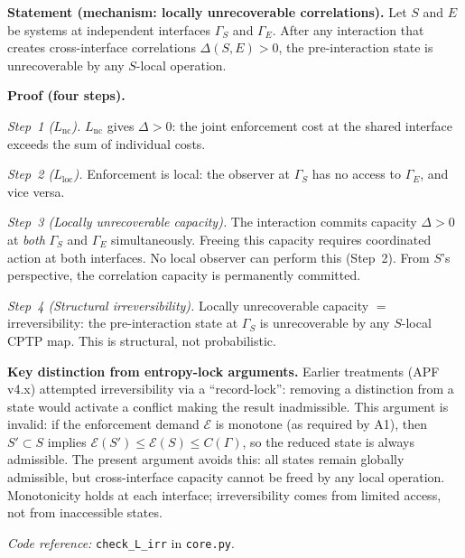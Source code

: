 \documentclass[11pt]{article}
\newcommand{\coderef}[2]{\smallskip\noindent\textit{Code reference:} \texttt{#1} in \texttt{#2}.}
\newcommand{\epitag}[1]{\textbf{[#1]}}
\begin{document}
\begin{tcolorbox}[apfbox, title={Lemma $L_{\mathrm{irr}}$ (Irreversibility from Admissibility Physics) \epitag{P}}]
\textbf{Statement (mechanism: locally unrecoverable correlations).}
Let $S$ and $E$ be systems at independent interfaces $\Gamma_S$ and
$\Gamma_E$.  After any interaction that creates cross-interface correlations
$\Delta(S,E) > 0$, the pre-interaction state is unrecoverable by any
$S$-local operation.

\textbf{Proof (four steps).}

\smallskip\noindent\emph{Step~1 ($L_{\mathrm{nc}}$).}  $L_{\mathrm{nc}}$
gives $\Delta > 0$: the joint enforcement cost at the shared interface exceeds
the sum of individual costs.

\smallskip\noindent\emph{Step~2 ($L_{\mathrm{loc}}$).}  Enforcement is local:
the observer at $\Gamma_S$ has no access to $\Gamma_E$, and vice versa.

\smallskip\noindent\emph{Step~3 (Locally unrecoverable capacity).}  The
interaction commits capacity $\Delta > 0$ at \emph{both} $\Gamma_S$ and
$\Gamma_E$ simultaneously.  Freeing this capacity requires coordinated action
at both interfaces.  No local observer can perform this (Step~2).  From $S$'s
perspective, the correlation capacity is permanently committed.

\smallskip\noindent\emph{Step~4 (Structural irreversibility).}  Locally
unrecoverable capacity $=$ irreversibility: the pre-interaction state at
$\Gamma_S$ is unrecoverable by any $S$-local CPTP map.  This is structural,
not probabilistic.

\textbf{Key distinction from entropy-lock arguments.}  Earlier treatments
(APF v4.x) attempted irreversibility via a ``record-lock'': removing a
distinction from a state would activate a conflict making the result
inadmissible.  This argument is invalid: if the enforcement demand $\mathcal{E}$
is monotone (as required by A1), then $S' \subset S$ implies
$\mathcal{E}(S') \leq \mathcal{E}(S) \leq C(\Gamma)$, so the reduced state
is always admissible.  The present argument avoids this: all states remain
globally admissible, but cross-interface capacity cannot be freed by any
local operation.  Monotonicity holds at each interface; irreversibility comes
from limited access, not from inaccessible states.

\coderef{check\_L\_irr}{core.py}
\end{tcolorbox}
\end{document}
